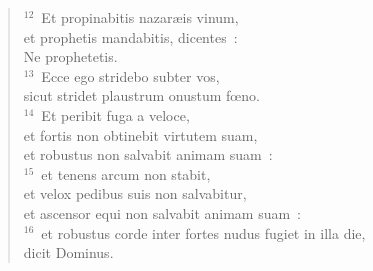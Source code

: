 \begin{flushleft}
\begin{verse}
${}^{12}$~Et propinabitis nazar\ae is vinum,\\ et prophetis mandabitis, dicentes~:\\ Ne prophetetis.\\
${}^{13}$~Ecce ego stridebo subter vos,\\ sicut stridet plaustrum onustum fœno.\\
${}^{14}$~Et peribit fuga a veloce,\\ et fortis non obtinebit virtutem suam,\\ et robustus non salvabit animam suam~:\\
${}^{15}$~et tenens arcum non stabit,\\ et velox pedibus suis non salvabitur,\\ et ascensor equi non salvabit animam suam~:\\
${}^{16}$~et robustus corde inter fortes nudus fugiet in illa die,\\ dicit Dominus.\end{verse}\end{flushleft}


